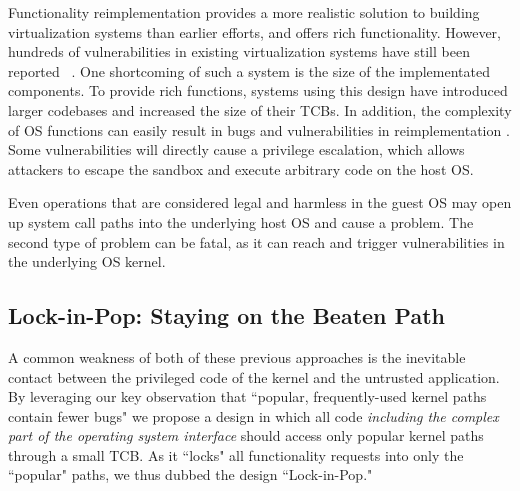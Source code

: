 Functionality reimplementation provides a more realistic solution to building
virtualization systems than earlier efforts, and offers rich functionality.
However, hundreds of vulnerabilities in existing virtualization systems have still been
reported ~\cite{NVD}. One shortcoming of such a system is the size
of the implementated components. To provide rich functions, systems using this design have
introduced larger codebases and increased the size of their TCBs. In addition, the
complexity of OS functions can easily result in bugs and vulnerabilities in
reimplementation . Some vulnerabilities
will directly cause a privilege escalation, which allows attackers to escape the sandbox
and execute arbitrary code on the host OS. 


Even operations that are considered
legal and harmless in the guest OS may open up system call paths into the underlying
host OS and cause a problem.
The second type of problem can be fatal,
as it can reach and trigger vulnerabilities in the underlying OS kernel.


\subsection{Lock-in-Pop: Staying on the Beaten Path }
A common weakness of both of these previous approaches is the inevitable contact
between the privileged code of the kernel and the untrusted application. 
By leveraging our key observation
 that ``popular, frequently-used kernel paths contain fewer bugs" we propose a design
in which all code \emph{including the complex part
of the operating system interface} should access only
popular kernel paths through a small TCB. As it ``locks" all functionality
 requests into only the ``popular" paths, we thus dubbed the
design ``Lock-in-Pop."

